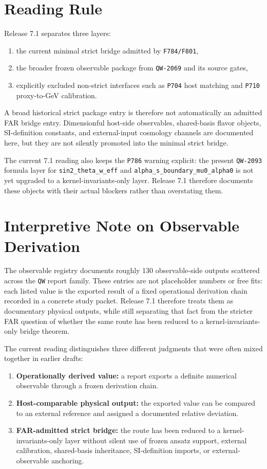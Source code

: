 \documentclass[11pt,a4paper]{article}
\begin{document}
\section{Reading Rule}

Release 7.1 separates three layers:
\begin{enumerate}[label=\arabic*.]
  \item the current minimal strict bridge admitted by \texttt{F784/F801},
  \item the broader frozen observable package from \texttt{QW-2069} and its source gates,
  \item explicitly excluded non-strict interfaces such as \texttt{P704} host matching and \texttt{P710} proxy-to-GeV calibration.
\end{enumerate}

A broad historical strict package entry is therefore not automatically an
admitted FAR bridge entry. Dimensionful host-side observables, shared-basis
flavor objects, SI-definition constants, and external-input cosmology channels
are documented here, but they are not silently promoted into the minimal strict
bridge.

The current 7.1 reading also keeps the \texttt{P786} warning explicit: the
present \texttt{QW-2093} formula layer for \texttt{sin2\_theta\_w\_eff} and
\texttt{alpha\_s\_boundary\_mu0\_alpha0} is not yet upgraded to a
kernel-invariants-only layer. Release 7.1 therefore documents these objects
with their actual blockers rather than overstating them.

\section{Interpretive Note on Observable Derivation}

The observable registry documents roughly 130 observable-side outputs scattered
across the \texttt{QW} report family. These entries are not placeholder numbers
or free fits: each listed value is the exported result of a fixed operational
derivation chain recorded in a concrete study packet. Release 7.1 therefore
treats them as documentary physical outputs, while still separating that fact
from the stricter FAR question of whether the same route has been reduced to a
kernel-invariants-only bridge theorem.

The current reading distinguishes three different judgments that were often
mixed together in earlier drafts:
\begin{enumerate}[label=\arabic*.]
  \item \textbf{Operationally derived value:} a report exports a definite numerical observable through a frozen derivation chain.
  \item \textbf{Host-comparable physical output:} the exported value can be compared to an external reference and assigned a documented relative deviation.
  \item \textbf{FAR-admitted strict bridge:} the route has been reduced to a kernel-invariants-only layer without silent use of frozen ansatz support, external calibration, shared-basis inheritance, SI-definition imports, or external-observable anchoring.
\end{enumerate}
\end{document}
